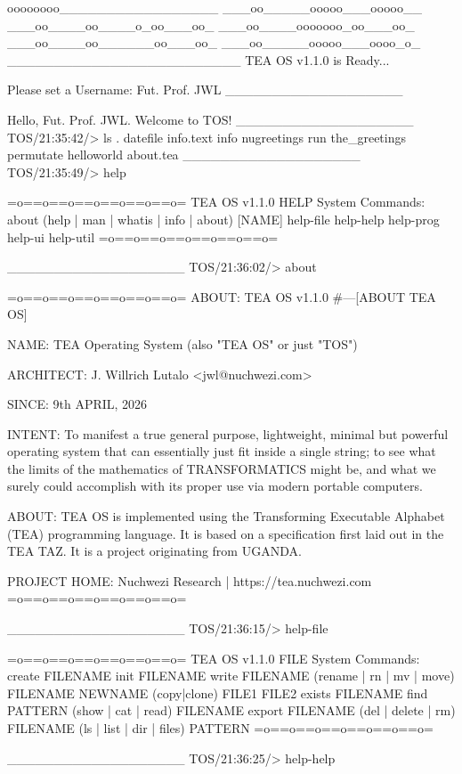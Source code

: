 \documentclass{article}
\begin{document}
   \begin{tcbverbatim}[title=TEA OS v1.1.0 Work Session, breakable]
oooooooo_________________
___oo_____ooooo___ooooo__
___oo____oo____o_oo___oo_
___oo____ooooooo_oo___oo_
___oo____oo______oo___oo_
___oo_____ooooo___oooo_o_
_________________________
TEA OS v1.1.0 is Ready...

Please set a Username:
Fut. Prof. JWL
___________________

Hello, Fut. Prof. JWL. Welcome to TOS! 
___________________
TOS/21:35:42/> 
ls
.
datefile
info.text
info
nugreetings
run
the_greetings
permutate
helloworld
about.tea
___________________
TOS/21:35:49/> 
help

=o==o==o==o==o==o==o=
TEA OS v1.1.0 HELP System Commands:
about
(help | man | whatis | info | about) [NAME]
help-file
help-help
help-prog
help-ui
help-util
=o==o==o==o==o==o==o=

___________________
TOS/21:36:02/> 
about

=o==o==o==o==o==o==o=
ABOUT: TEA OS v1.1.0 
#---[ABOUT TEA OS]

NAME: TEA Operating System 
(also "TEA OS" or just "TOS")

ARCHITECT: J. Willrich Lutalo <jwl@nuchwezi.com>

SINCE: 9th APRIL, 2026

INTENT: To manifest a true general purpose, lightweight, minimal but powerful operating system that can essentially just fit inside a single string; to see what the limits of the mathematics of TRANSFORMATICS might be, and what we surely could accomplish with its proper use via modern portable computers.

ABOUT: TEA OS is implemented using the Transforming Executable Alphabet (TEA) programming language. It is based on a specification first laid out in the TEA TAZ. It is a project originating from UGANDA.

PROJECT HOME: Nuchwezi Research | https://tea.nuchwezi.com
=o==o==o==o==o==o==o=

___________________
TOS/21:36:15/> 
help-file

=o==o==o==o==o==o==o=
TEA OS v1.1.0 FILE System Commands:
create FILENAME
init FILENAME
write FILENAME
(rename | rn | mv | move) FILENAME NEWNAME
(copy|clone) FILE1 FILE2
exists FILENAME
find PATTERN
(show | cat | read) FILENAME
export FILENAME
(del | delete | rm) FILENAME
(ls | list | dir | files) PATTERN
=o==o==o==o==o==o==o=

___________________
TOS/21:36:25/> 
help-help


\end{tcbverbatim}
\end{document}
